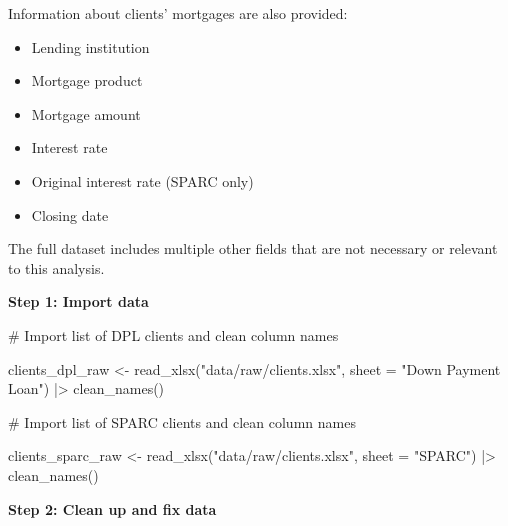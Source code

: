 \documentclass[
  letterpaper,
  DIV=11,
  numbers=noendperiod]{scrartcl}
\newenvironment{Shaded}{\begin{snugshade}}{\end{snugshade}}
\newcommand{\AttributeTok}[1]{\textcolor[rgb]{0.40,0.45,0.13}{#1}}
\newcommand{\CommentTok}[1]{\textcolor[rgb]{0.37,0.37,0.37}{#1}}
\newcommand{\FunctionTok}[1]{\textcolor[rgb]{0.28,0.35,0.67}{#1}}
\newcommand{\NormalTok}[1]{\textcolor[rgb]{0.00,0.23,0.31}{#1}}
\newcommand{\OtherTok}[1]{\textcolor[rgb]{0.00,0.23,0.31}{#1}}
\newcommand{\SpecialCharTok}[1]{\textcolor[rgb]{0.37,0.37,0.37}{#1}}
\newcommand{\StringTok}[1]{\textcolor[rgb]{0.13,0.47,0.30}{#1}}
\providecommand{\tightlist}{%
  \setlength{\itemsep}{0pt}\setlength{\parskip}{0pt}}\usepackage{longtable,booktabs,array}
\begin{document}
Information about clients' mortgages are also provided:

\begin{itemize}
\tightlist
\item
  Lending institution
\item
  Mortgage product
\item
  Mortgage amount
\item
  Interest rate
\item
  Original interest rate (SPARC only)
\item
  Closing date
\end{itemize}

The full dataset includes multiple other fields that are not necessary
or relevant to this analysis.

\textbf{Step 1: Import data}

\begin{Shaded}
\begin{Highlighting}[]
\CommentTok{\# Import list of DPL clients and clean column names}

\NormalTok{clients\_dpl\_raw }\OtherTok{\textless{}{-}} \FunctionTok{read\_xlsx}\NormalTok{(}\StringTok{"data/raw/clients.xlsx"}\NormalTok{,}
                             \AttributeTok{sheet =} \StringTok{"Down Payment Loan"}\NormalTok{) }\SpecialCharTok{|\textgreater{}} 
  \FunctionTok{clean\_names}\NormalTok{()}
  

\CommentTok{\# Import list of SPARC clients and clean column names}

\NormalTok{clients\_sparc\_raw }\OtherTok{\textless{}{-}} \FunctionTok{read\_xlsx}\NormalTok{(}\StringTok{"data/raw/clients.xlsx"}\NormalTok{,}
                             \AttributeTok{sheet =} \StringTok{"SPARC"}\NormalTok{) }\SpecialCharTok{|\textgreater{}} 
  \FunctionTok{clean\_names}\NormalTok{()}
\end{Highlighting}
\end{Shaded}

\textbf{Step 2: Clean up and fix data}
\end{document}
